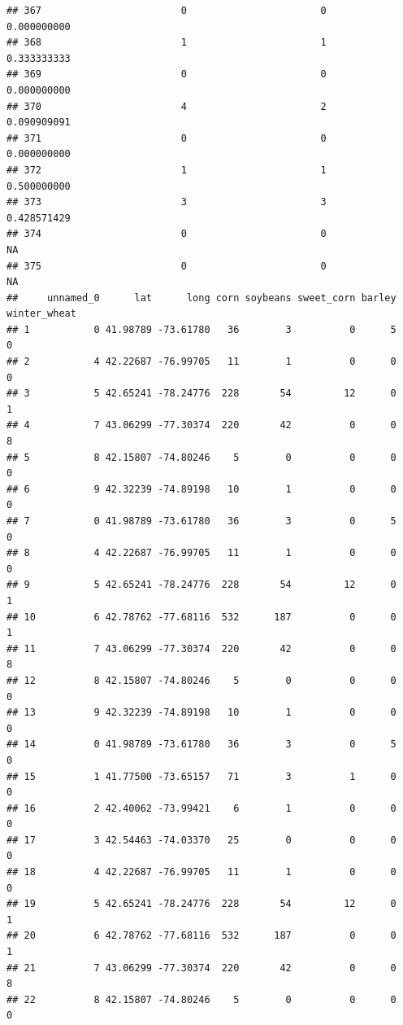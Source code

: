 \documentclass[
]{article}
\begin{document}
\begin{verbatim}
## 367                        0                       0               0.000000000
## 368                        1                       1               0.333333333
## 369                        0                       0               0.000000000
## 370                        4                       2               0.090909091
## 371                        0                       0               0.000000000
## 372                        1                       1               0.500000000
## 373                        3                       3               0.428571429
## 374                        0                       0                        NA
## 375                        0                       0                        NA
##     unnamed_0      lat      long corn soybeans sweet_corn barley winter_wheat
## 1           0 41.98789 -73.61780   36        3          0      5            0
## 2           4 42.22687 -76.99705   11        1          0      0            0
## 3           5 42.65241 -78.24776  228       54         12      0            1
## 4           7 43.06299 -77.30374  220       42          0      0            8
## 5           8 42.15807 -74.80246    5        0          0      0            0
## 6           9 42.32239 -74.89198   10        1          0      0            0
## 7           0 41.98789 -73.61780   36        3          0      5            0
## 8           4 42.22687 -76.99705   11        1          0      0            0
## 9           5 42.65241 -78.24776  228       54         12      0            1
## 10          6 42.78762 -77.68116  532      187          0      0            1
## 11          7 43.06299 -77.30374  220       42          0      0            8
## 12          8 42.15807 -74.80246    5        0          0      0            0
## 13          9 42.32239 -74.89198   10        1          0      0            0
## 14          0 41.98789 -73.61780   36        3          0      5            0
## 15          1 41.77500 -73.65157   71        3          1      0            0
## 16          2 42.40062 -73.99421    6        1          0      0            0
## 17          3 42.54463 -74.03370   25        0          0      0            0
## 18          4 42.22687 -76.99705   11        1          0      0            0
## 19          5 42.65241 -78.24776  228       54         12      0            1
## 20          6 42.78762 -77.68116  532      187          0      0            1
## 21          7 43.06299 -77.30374  220       42          0      0            8
## 22          8 42.15807 -74.80246    5        0          0      0            0

\end{verbatim}
\end{document}
